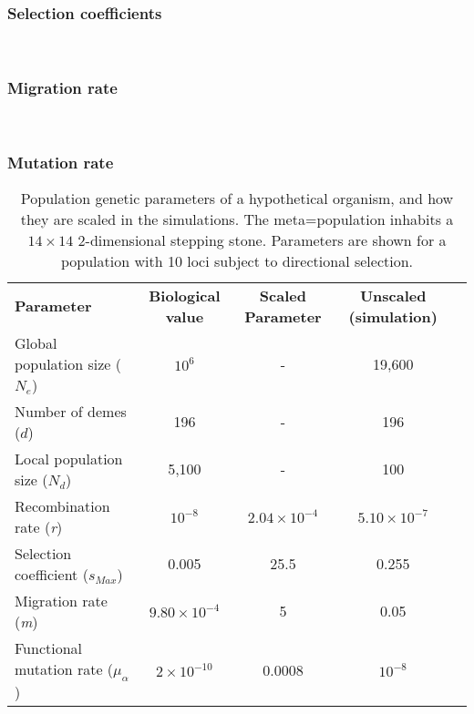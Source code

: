 \documentclass[11pt,twoside,lineno]{GSA_format}
\begin{document}
\subsubsection{Selection coefficients} \\ 

\subsubsection{Migration rate} \\

\subsubsection{Mutation rate} 

\begin{table}[]
\label{SimulationParameters}
\caption{Population genetic parameters of a hypothetical organism, and how they are scaled in the simulations. The meta=population inhabits a $14\times14$ 2-dimensional stepping stone. Parameters are shown for a population with 10 loci subject to directional selection.}
\begin{tabular}{lcccl}
\cline{1-4}
\textbf{Parameter} & \textbf{Biological value} & \textbf{Scaled Parameter}        & \textbf{Unscaled (simulation)} \\ \cline{1-4}
Global population size ($N_e$)                 & $10^6$                                      & -                           & 19,600                                              &           \\
Number of demes ($d$)                  & 196                                      & -                           & 196                                                &           \\
Local population size ($N_d$)                  & 5,100                                      & -                           & 100                                                &           \\
Recombination rate (\textit{r})                        & $10^{-8}$                                      & $2.04 \times 10^{-4}$ & $5.10 \times 10^{-7}$                                           &           \\
Selection coefficient (\textit{$s_{Max}$})                        & 0.005                                         & 25.5 & 0.255                                           &           \\
Migration rate (\textit{m})                        & $9.80\times 10^{-4}$                                      & 5        & 0.05                                               &           \\
Functional mutation rate (\textit{$\mu_\alpha$})                        & $2\times 10^{-10}$                                      & 0.0008        & $10^{-8}$ &           \\ \cline{1-4}
\end{tabular}
\end{table}
\end{document}
